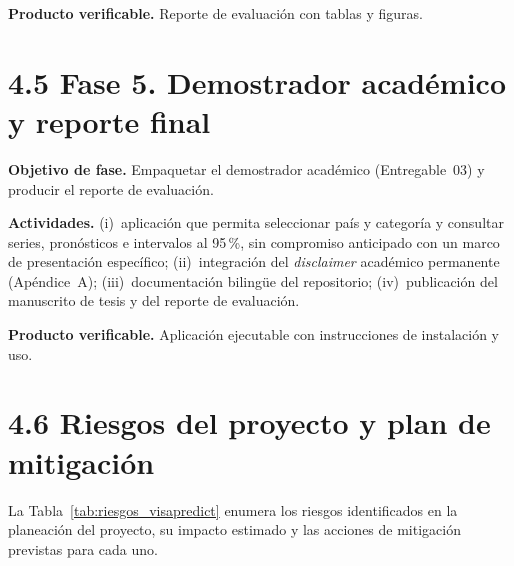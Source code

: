 \documentclass[12pt,letterpaper]{report}
\begin{document}
\textbf{Producto verificable.} Reporte de evaluación con tablas y figuras.

\section{4.5 Fase 5. Demostrador académico y reporte final}

\textbf{Objetivo de fase.} Empaquetar el demostrador académico (Entregable~03) y producir el reporte de evaluación.

\textbf{Actividades.} (i)~aplicación que permita seleccionar país y categoría y consultar series, pronósticos e intervalos al 95\,\%, sin compromiso anticipado con un marco de presentación específico; (ii)~integración del \textit{disclaimer} académico permanente (Apéndice~A); (iii)~documentación bilingüe del repositorio; (iv)~publicación del manuscrito de tesis y del reporte de evaluación.

\textbf{Producto verificable.} Aplicación ejecutable con instrucciones de instalación y uso.

\section{4.6 Riesgos del proyecto y plan de mitigación}

La Tabla~\ref{tab:riesgos_visapredict} enumera los riesgos identificados en la planeación del proyecto, su impacto estimado y las acciones de mitigación previstas para cada uno.
\end{document}
